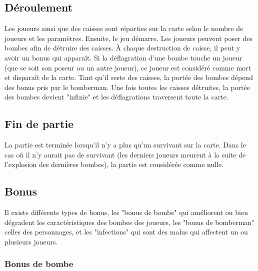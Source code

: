 \subsection{Déroulement}

Les joueurs ainsi que des caisses sont réparties sur la carte selon le nombre de joueurs et les paramètres. Ensuite, le jeu démarre. Les joueurs peuvent poser des bombes afin de détruire des caisses. À chaque destruction de caisse, il peut y avoir un bonus qui apparaît. Si la déflagration d'une bombe touche un joueur (que se soit son poseur ou un autre joueur), ce joueur est considéré comme mort et disparaît de la carte. Tant qu'il reste des caisses, la portée des bombes dépend des bonus pris par le bomberman. Une fois toutes les caisses détruites, la portée des bombes devient "infinie" et les déflagrations traversent toute la carte.

\subsection{Fin de partie}

La partie est terminée lorsqu'il n'y a plus qu'un survivant sur la carte. Dans le cas où il n'y aurait pas de survivant (les derniers joueurs meurent à la suite de l'explosion des dernières bombes), la partie est considérée comme nulle.

\subsection{Bonus}

Il existe différents types de bonus, les "bonus de bombe" qui améliorent ou bien dégradent les caractéristiques des bombes des joueurs, les "bonus de bomberman" celles des personnages, et les "infections" qui sont des malus qui affectent un ou plusieurs joueurs.

\subsubsection{Bonus de bombe}

